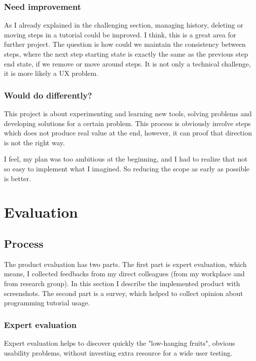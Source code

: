\documentclass[12pt, a4paper, oneside, openright, medskipamount]{report}
\begin{document}
\subsection {Need improvement}

As I already explained in the challenging section, managing history, deleting or moving steps in a tutorial could be improved. I think, this is a great area for further project. The question is how could we maintain the consistency between steps, where the next step starting state is exactly the same as the previous step end state, if we remove or move around steps. It is not only a technical challenge, it is more likely a UX problem.

\subsection {Would do differently?}

This project is about experimenting and learning new tools, solving problems and developing solutions for a certain problem. This process is obviously involve steps which does not produce real value at the end, however, it can proof that direction is not the right way.

I feel, my plan was too ambitious at the beginning, and I had to realize that not so easy to implement what I imagined. So reducing the scope as early as possible is better.

\chapter{Evaluation}

\section{Process}

The product evaluation has two parts. The first part is expert evaluation, which means, I collected feedbacks from my direct colleagues (from my workplace and from research group). In this section I describe the implemented product with screenshots. The second part is a survey, which helped to collect opinion about programming tutorial usage.

\subsection{Expert evaluation}

Expert evaluation helps to discover quickly the "low-hanging fruits", obvious usability problems, without investing extra resource for a wide user testing.
\end{document}
